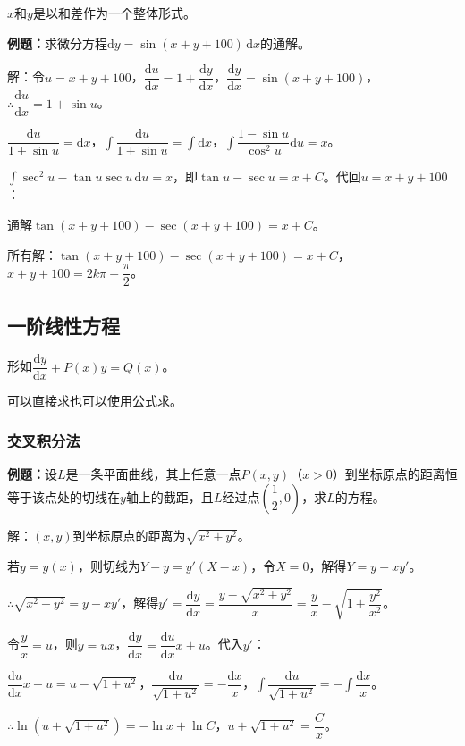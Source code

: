 $x$和$y$是以和差作为一个整体形式。

\textbf{例题：}求微分方程$\textrm{d}y=\sin(x+y+100)\,\textrm{d}x$的通解。

解：令$u=x+y+100$，$\dfrac{\textrm{d}u}{\textrm{d}x}=1+\dfrac{\textrm{d}y}{\textrm{d}x}$，$\dfrac{\textrm{d}y}{\textrm{d}x}=\sin(x+y+100)$，$\therefore\dfrac{\textrm{d}u}{\textrm{d}x}=1+\sin u$。

$\dfrac{\textrm{d}u}{1+\sin u}=\textrm{d}x$，$\displaystyle{\int\dfrac{\textrm{d}u}{1+\sin u}}=\int\textrm{d}x$，$\displaystyle{\int\dfrac{1-\sin u}{\cos^2u}}\textrm{d}u=x$。

$\int\sec^2u-\tan u\sec u\,\textrm{d}u=x$，即$\tan u-\sec u=x+C$。代回$u=x+y+100$：

通解$\tan(x+y+100)-\sec(x+y+100)=x+C$。

所有解：$\tan(x+y+100)-\sec(x+y+100)=x+C$，$x+y+100=2k\pi-\dfrac{\pi}{2}$。

\subsection{一阶线性方程}

形如$\dfrac{\textrm{d}y}{\textrm{d}x}+P(x)y=Q(x)$。

可以直接求也可以使用公式求。

\subsubsection{交叉积分法}

\textbf{例题：}设$L$是一条平面曲线，其上任意一点$P(x,y)$（$x>0$）到坐标原点的距离恒等于该点处的切线在$y$轴上的截距，且$L$经过点$\left(\dfrac{1}{2},0\right)$，求$L$的方程。

解：$(x,y)$到坐标原点的距离为$\sqrt{x^2+y^2}$。

若$y=y(x)$，则切线为$Y-y=y'(X-x)$，令$X=0$，解得$Y=y-xy'$。

$\therefore\sqrt{x^2+y^2}=y-xy'$，解得$y'=\dfrac{\textrm{d}y}{\textrm{d}x}=\dfrac{y-\sqrt{x^2+y^2}}{x}=\dfrac{y}{x}-\sqrt{1+\dfrac{y^2}{x^2}}$。

令$\dfrac{y}{x}=u$，则$y=ux$，$\dfrac{\textrm{d}y}{\textrm{d}x}=\dfrac{\textrm{d}u}{\textrm{d}x}x+u$。代入$y'$：

$\dfrac{\textrm{d}u}{\textrm{d}x}x+u=u-\sqrt{1+u^2}$，$\dfrac{\textrm{d}u}{\sqrt{1+u^2}}=-\dfrac{\textrm{d}x}{x}$，$\displaystyle{\int\dfrac{\textrm{d}u}{\sqrt{1+u^2}}=-\int\dfrac{\textrm{d}x}{x}}$。

$\therefore\ln(u+\sqrt{1+u^2})=-\ln x+\ln C$，$u+\sqrt{1+u^2}=\dfrac{C}{x}$。

